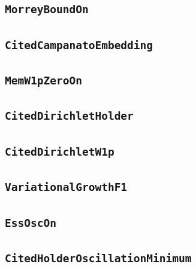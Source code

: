 \documentclass[11pt]{amsart}
\theoremstyle{definition}
\begin{document}
\subsection{\texorpdfstring{\texttt{MorreyBoundOn}}{MorreyBoundOn}}\label{node:MorreyBoundOn}


\subsection{\texorpdfstring{\texttt{CitedCampanatoEmbedding}}{CitedCampanatoEmbedding}}\label{node:CitedCampanatoEmbedding}


\subsection{\texorpdfstring{\texttt{MemW1pZeroOn}}{MemW1pZeroOn}}\label{node:MemW1pZeroOn}


\subsection{\texorpdfstring{\texttt{CitedDirichletHolder}}{CitedDirichletHolder}}\label{node:CitedDirichletHolder}


\subsection{\texorpdfstring{\texttt{CitedDirichletW1p}}{CitedDirichletW1p}}\label{node:CitedDirichletW1p}


\subsection{\texorpdfstring{\texttt{VariationalGrowthF1}}{VariationalGrowthF1}}\label{node:VariationalGrowthF1}


\subsection{\texorpdfstring{\texttt{EssOscOn}}{EssOscOn}}\label{node:EssOscOn}


\subsection{\texorpdfstring{\texttt{CitedHolderOscillationMinimum}}{CitedHolderOscillationMinimum}}\label{node:CitedHolderOscillationMinimum}

\end{document}
